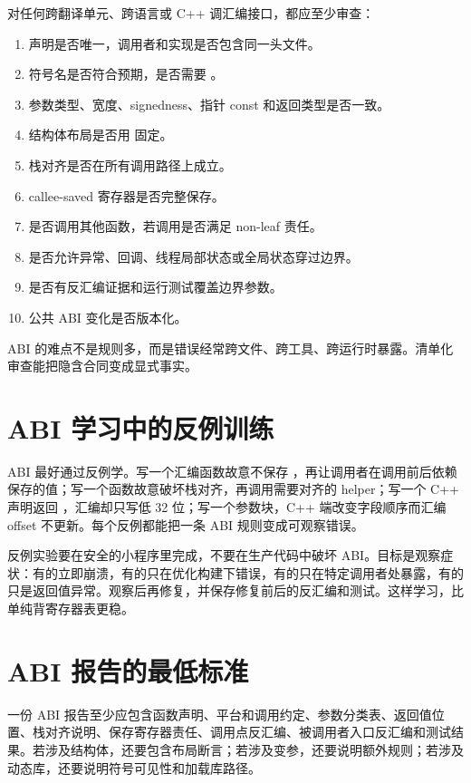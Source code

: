 对任何跨翻译单元、跨语言或 C++ 调汇编接口，都应至少审查：

\begin{enumerate}
  \item 声明是否唯一，调用者和实现是否包含同一头文件。
  \item 符号名是否符合预期，是否需要 。
  \item 参数类型、宽度、signedness、指针 const 和返回类型是否一致。
  \item 结构体布局是否用  固定。
  \item 栈对齐是否在所有调用路径上成立。
  \item callee-saved 寄存器是否完整保存。
  \item 是否调用其他函数，若调用是否满足 non-leaf 责任。
  \item 是否允许异常、回调、线程局部状态或全局状态穿过边界。
  \item 是否有反汇编证据和运行测试覆盖边界参数。
  \item 公共 ABI 变化是否版本化。
\end{enumerate}

ABI 的难点不是规则多，而是错误经常跨文件、跨工具、跨运行时暴露。清单化审查能把隐含合同变成显式事实。

\section{ABI 学习中的反例训练}

ABI 最好通过反例学。写一个汇编函数故意不保存 ，再让调用者在调用前后依赖  保存的值；写一个函数故意破坏栈对齐，再调用需要对齐的 helper；写一个 C++ 声明返回 ，汇编却只写低 32 位；写一个参数块，C++ 端改变字段顺序而汇编 offset 不更新。每个反例都能把一条 ABI 规则变成可观察错误。

反例实验要在安全的小程序里完成，不要在生产代码中破坏 ABI。目标是观察症状：有的立即崩溃，有的只在优化构建下错误，有的只在特定调用者处暴露，有的只是返回值异常。观察后再修复，并保存修复前后的反汇编和测试。这样学习，比单纯背寄存器表更稳。

\section{ABI 报告的最低标准}

一份 ABI 报告至少应包含函数声明、平台和调用约定、参数分类表、返回值位置、栈对齐说明、保存寄存器责任、调用点反汇编、被调用者入口反汇编和测试结果。若涉及结构体，还要包含布局断言；若涉及变参，还要说明额外规则；若涉及动态库，还要说明符号可见性和加载库路径。

